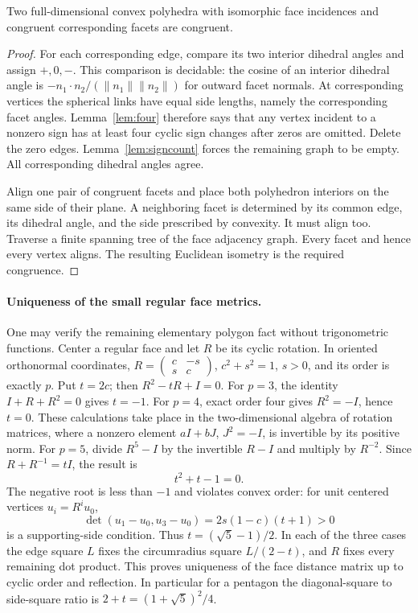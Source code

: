 \begin{theorem}\label{thm:cauchy}
Two full-dimensional convex polyhedra with isomorphic face incidences
and congruent corresponding facets are congruent.
\end{theorem}
\begin{proof}
For each corresponding edge, compare its two interior dihedral
angles and assign $+,0,-$. This comparison is decidable: the cosine
of an interior dihedral angle is
$-n_1\cdot n_2/(\lVert n_1\rVert\lVert n_2\rVert)$ for outward
facet normals. At corresponding vertices the spherical links have
equal side lengths, namely the corresponding facet angles.
Lemma~\ref{lem:four} therefore says that any vertex incident to a
nonzero sign has at least four cyclic sign changes after zeros are
omitted. Delete the zero edges. Lemma~\ref{lem:signcount} forces the
remaining graph to be empty. All corresponding dihedral angles agree.

Align one pair of congruent facets and place both polyhedron interiors
on the same side of their plane. A neighboring facet is determined
by its common edge, its dihedral angle, and the side prescribed by
convexity. It must align too. Traverse a finite spanning tree of the
face adjacency graph. Every facet and hence every vertex aligns.
The resulting Euclidean isometry is the required congruence.
\end{proof}

\paragraph{Uniqueness of the small regular face metrics.}
One may verify the remaining elementary polygon fact without
trigonometric functions. Center a regular face and let $R$ be its
cyclic rotation. In oriented orthonormal coordinates,
$R=\left(\begin{smallmatrix}c&-s\\s&c\end{smallmatrix}\right)$,
$c^2+s^2=1$, $s>0$, and its order is exactly $p$. Put $t=2c$;
then $R^2-tR+I=0$. For $p=3$, the identity
$I+R+R^2=0$ gives $t=-1$. For $p=4$, exact order four gives
$R^2=-I$, hence $t=0$. These calculations take place in the
two-dimensional algebra of rotation matrices, where a nonzero
element $aI+bJ$, $J^2=-I$, is invertible by its positive norm.
For $p=5$, divide $R^5-I$ by the invertible $R-I$ and multiply
by $R^{-2}$. Since $R+R^{-1}=tI$, the result is
\[
 t^2+t-1=0.
\]
The negative root is less than $-1$ and violates convex order:
for unit centered vertices $u_i=R^iu_0$,
\[
 \det(u_1-u_0,u_3-u_0)=2s(1-c)(t+1)>0
\]
is a supporting-side condition. Thus
$t=(\sqrt5-1)/2$. In each of the three cases the edge square $L$
fixes the circumradius square $L/(2-t)$, and $R$ fixes every remaining
dot product. This proves uniqueness of the face distance matrix up
to cyclic order and reflection. In particular for a pentagon the
diagonal-square to side-square ratio is $2+t=(1+\sqrt5)^2/4$.

